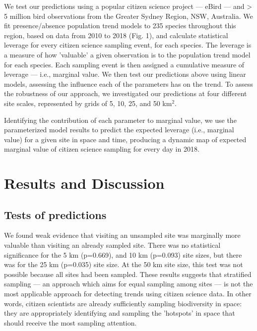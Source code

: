 \documentclass[9pt,twocolumn,twoside,lineno]{pnas-new}
\begin{document}
We test our predictions using a popular citizen science project --- eBird \cite{sullivan2009ebird} --- and > 5 million bird observations from the Greater Sydney Region, NSW, Australia. We fit presence/absence population trend models to 235 species throughout this region, based on data from 2010 to 2018 (Fig. 1), and calculate statistical leverage for every citizen science sampling event, for each species. The leverage is a measure of how 'valuable' a given observation is to the population trend model for each species. Each sampling event is then assigned a cumulative measure of leverage --- i.e., marginal value. We then test our predictions above using linear models, assessing the influence each of the parameters has on the trend. To assess the robustness of our approach, we investigated our predictions at four different site scales, represented by grids of 5, 10, 25, and 50 km$^{2}$. 

Identifying the contribution of each parameter to marginal value, we use the parameterized model results to predict the expected leverage (i.e., marginal value) for a given site in space and time, producing a dynamic map of expected marginal value of citizen science sampling for every day in 2018.

\section*{Results and Discussion}
\subsection*{Tests of predictions}
We found weak evidence that visiting an unsampled site was marginally more valuable than visiting an already sampled site. There was no statistical significance for the 5 km (p=0.669), and 10 km (p=0.093) site sizes, but there was for the 25 km (p=0.035) site size. At the 50 km site size, this test was not possible because all sites had been sampled. These results suggests that stratified sampling --- an approach which aims for equal sampling among sites --- \cite{baillie2008toward, longino1997biodiversity} is not the most applicable approach for detecting trends using citizen science data. In other words, citizen scientists are already sufficiently sampling biodiversity in space: they are appropriately identifying and sampling the 'hotspots' in space that should receive the most sampling attention.
\end{document}
